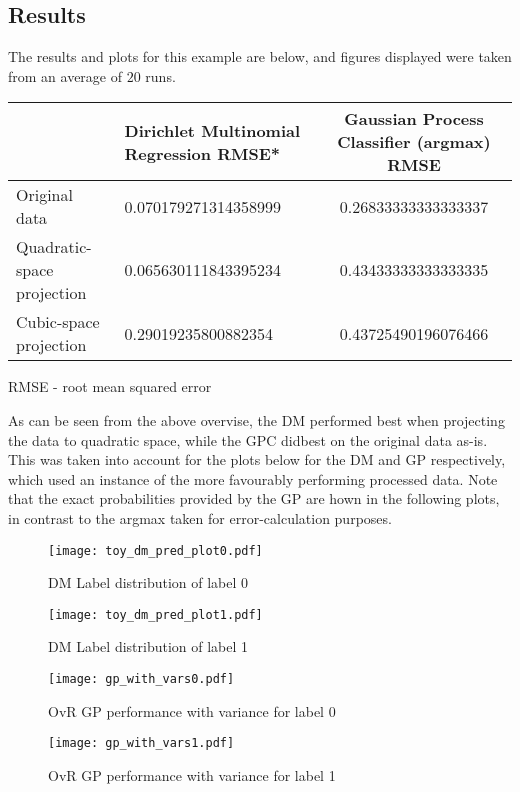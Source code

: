 \subsection{Results}

The results and plots for this example are below, and figures displayed were taken from an average of $20$ runs.

\begin{tabular}{|C{4cm}|C{4cm}|c|}
    \hline
    & Dirichlet Multinomial Regression RMSE* & Gaussian Process Classifier (argmax) RMSE \\\hline
    Original data & 0.070179271314358999 & 0.26833333333333337 \\\hline
    Quadratic-space projection & 0.065630111843395234 & 0.43433333333333335 \\\hline
    Cubic-space projection & 0.29019235800882354 & 0.43725490196076466 \\\hline
\end{tabular}
\begingroup
\tiny{RMSE - root mean squared error}
\endgroup

As can be seen from the above overvise, the DM performed best when projecting the data to quadratic space, while the GPC didbest on the original data as-is. This was taken into account for the plots below for the DM and GP respectively, which used an instance of the more favourably performing processed data. Note that the exact probabilities provided by the GP are hown in the following plots, in contrast to the argmax taken for error-calculation purposes.

\begin{figure}[H]
    \texttt{[image: toy\_dm\_pred\_plot0.pdf]}
    \caption{DM Label distribution of label 0}
    \label{fig:toylabel0}
\end{figure}
\begin{figure}[H]
    \texttt{[image: toy\_dm\_pred\_plot1.pdf]}
    \caption{DM Label distribution of label 1}
    \label{fig:toylabel1}
\end{figure} 

\begin{figure}[H]
    \texttt{[image: gp\_with\_vars0.pdf]}
    \caption{OvR GP performance with variance for label 0}
    \label{fig:toylabel0}
\end{figure}
\begin{figure}[H]
    \texttt{[image: gp\_with\_vars1.pdf]}
    \caption{OvR GP performance with variance for label 1}
    \label{fig:toylabel1}
\end{figure} 

